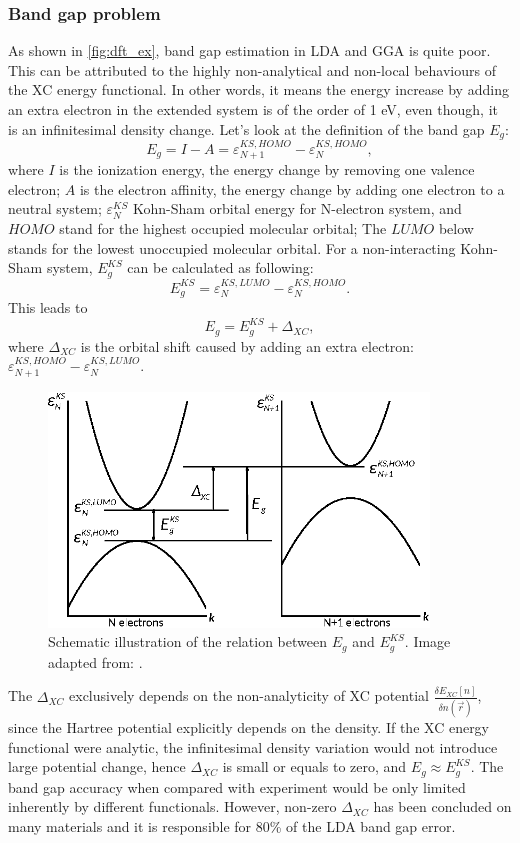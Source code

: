 \subsubsection{Band gap problem}
As shown in \autoref{fig:dft_ex}, band gap estimation in LDA and GGA is quite poor. This can be attributed to the highly non-analytical and non-local behaviours of the XC energy functional. In other words, it means the energy increase by adding an extra electron in the extended system is of the order of 1 eV, even though, it is an infinitesimal density change. Let's look at the definition of the band gap $E_{g}$:
\begin{equation}
E_{g}=I-A=\varepsilon_{N+1}^{KS,HOMO}-\varepsilon_N^{KS,HOMO},
\end{equation}
where $I$ is the ionization energy, the energy change by removing one valence electron; $A$ is the electron affinity, the energy change by adding one electron to a neutral system; $\varepsilon_N^{KS}$ Kohn-Sham orbital energy for N-electron system, and $HOMO$ stand for the highest occupied molecular orbital; The $LUMO$ below stands for the lowest unoccupied molecular orbital. For a non-interacting Kohn-Sham system, $E_{g}^{KS}$ can be calculated as following:
\begin{equation}
E_{g}^{KS}=\varepsilon_{N}^{KS,LUMO}-\varepsilon_{N}^{KS,HOMO}.
\end{equation}
This leads to 
\begin{equation}
E_{g}=E_{g}^{KS}+\Delta_{XC},
\end{equation}
where $\Delta_{XC}$ is the orbital shift caused by adding an extra electron: $\varepsilon_{N+1}^{KS,HOMO}-\varepsilon_{N}^{KS,LUMO}$.
\begin{figure}[htbp!] 
\centering  
\includegraphics[width=0.9\textwidth]{Eg.eps}
\caption{ Schematic illustration of the relation between $E_g$ and $E^{KS}_g$. Image adapted from: \cite{fiolhais2008primer}.}  
\label{fig:dft_eg}
\end{figure} 
The $\Delta_{XC}$ exclusively depends on the non-analyticity of XC potential $\frac{\delta E_{XC}[n]}{\delta n(\vec{r})}$, since the Hartree potential explicitly depends on the density. If the XC energy functional were analytic, the infinitesimal density variation would not introduce large potential change, hence $\Delta_{XC}$ is small or equals to zero, and $E_g \approx E^{KS}_g$. The band gap accuracy when compared with experiment would be only limited inherently by different functionals. However, non-zero $\Delta_{XC}$ has been concluded on many materials and it is responsible for 80\% of the LDA band gap error\cite{Godby1988}. 
